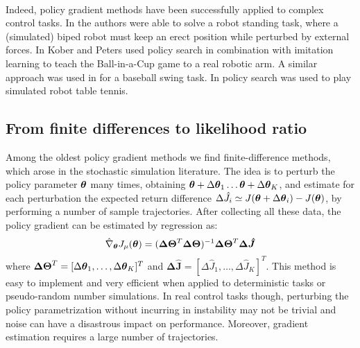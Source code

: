 \paragraph{} %
Indeed, policy gradient methods have been successfully applied to complex control tasks. In \cite{Sehnke2008policy} the authors were able to solve a robot standing task, where a (simulated) biped robot must keep an erect position while perturbed by external forces. In \cite{kober_NIPS2008} Kober and Peters used policy search in combination with imitation learning to teach the Ball-in-a-Cup game to a real robotic arm. A similar approach was used in \cite{Peters2008natural} for a baseball swing task. In \cite{peters2010relative} policy search was used to play simulated robot table tennis. 

\subsection{From finite differences to likelihood ratio}
Among the oldest policy gradient methods we find finite-difference methods, which arose in the stochastic simulation literature. The idea is to perturb the policy parameter $\boldsymbol{\theta}$ many times, obtaining $\boldsymbol{\theta}+\Delta\boldsymbol{\theta}_1 \dots \boldsymbol{\theta}+\Delta\boldsymbol{\theta}_K$, and estimate for each perturbation the expected return difference $\Delta\hat{J}_i \simeq J(\boldsymbol{\theta}+\Delta\boldsymbol{\theta}_i) - J(\boldsymbol{\theta})$, by performing a number of sample trajectories. After collecting all these data, the policy gradient can be estimated by regression as:
\[
	\hat{\nabla}_{\boldsymbol{\theta}}J_{\mu}(\boldsymbol{\theta}) = (\boldsymbol{\Delta\Theta}^T\boldsymbol{\Delta\Theta})^{-1}\boldsymbol{\Delta\Theta}^T\boldsymbol{\Delta\hat{J}}
\]
where $\boldsymbol{\Delta\Theta}^T = [\Delta\boldsymbol{\theta}_1,\dots,\Delta\boldsymbol{\theta}_K]^T$ and $\boldsymbol{\Delta\hat{J}} = [\Delta\hat{J}_1,\dots,\Delta\hat{J}_K]^T$. This method is easy to implement and very efficient when applied to deterministic tasks or pseudo-random number simulations. In real control tasks though, perturbing the policy parametrization without incurring in instability may not be trivial and noise can have a disastrous impact on performance. Moreover, gradient estimation requires a large number of trajectories.
